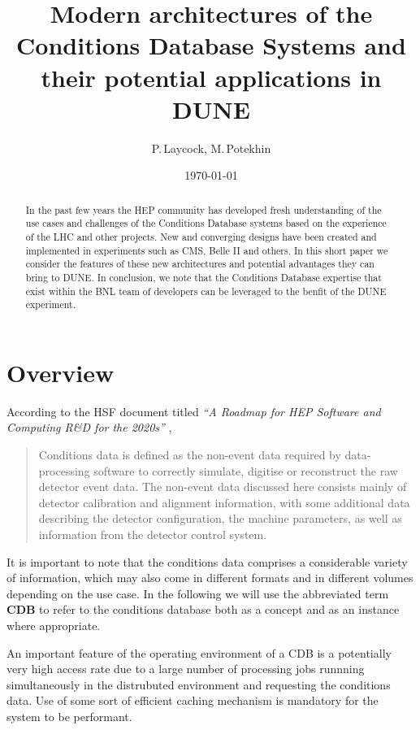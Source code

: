 \documentclass[pdftex,12pt,letter]{article}
\title{Modern architectures of the Conditions Database Systems and their potential applications in DUNE}
\date{\today}
\author{P.\,Laycock, M.\,Potekhin}
\begin{document}
\maketitle

\begin{abstract}
\noindent  In the past few years the HEP community has developed fresh understanding of
the use cases and challenges of the Conditions Database systems based on the experience
of the LHC and other projects. New and converging designs have been created and
implemented in experiments such as CMS, Belle II and others. In this short paper we consider the features
of these new architectures and potential advantages they can bring to DUNE. In conclusion,
we note that the Conditions Database expertise that exist within the BNL team of developers
can be leveraged to the benfit of the DUNE experiment.

\end{abstract}


\section{Overview}
According to  the HSF document titled \textit{``A Roadmap for HEP Software and Computing R\&D for the 2020s''} \cite{hsf_roadmap},
\begin{quote}
Conditions data is defined as the non-event data required by data-processing software to correctly simulate,
digitise or reconstruct the raw detector event data. The non-event data discussed here consists mainly of
detector calibration and alignment information, with some additional data describing the detector configuration,
the machine parameters, as well as information from the detector control system.
\end{quote}
\noindent It is important to note that the conditions data comprises a considerable variety of information,
which may also come in different formats and in different volumes depending on the use case. In the following
we will use the abbreviated term \textbf{CDB } to refer to the conditions database both as a concept and as an
instance where appropriate.

An important feature of the operating environment of a CDB is a potentially very high
access rate due to a large number of processing jobs runnning simultaneously in the distrubuted environment
and requesting the conditions data. Use of some sort of efficient caching mechanism is mandatory for
the system to be performant.
\end{document}
